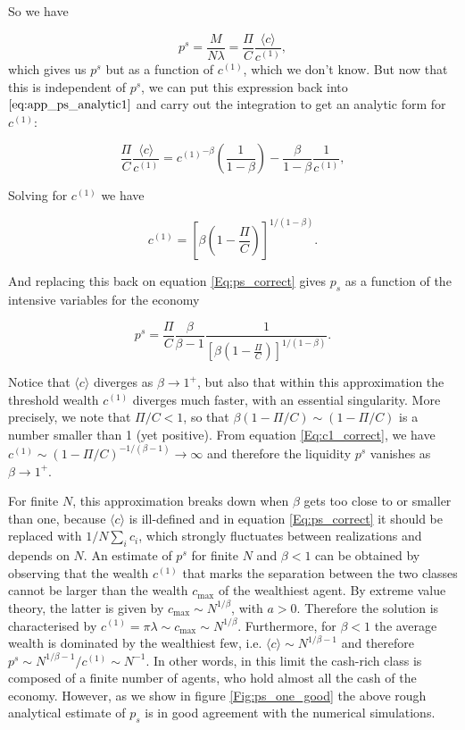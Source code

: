 So we have

\begin{equation}
 \label{Eq:ps_correct}
p^s = \frac{M}{N \lambda} = \frac{\Pi}{C} \frac{\langle c \rangle}{c^{(1)}},
\end{equation} 
which gives us $p^s$ but as a function of $c^{(1)}$, which we don't know. But now that this is independent of $p^s$, we can put this expression back into $\eqref{eq:app_ps_analytic1}$ and carry out the integration to get an analytic form for $c^{(1)}$:

\begin{equation}
\frac{\Pi}{C} \frac{\langle c \rangle}{c^{(1)}} = {c^{(1)}}^{-\beta} \left( \frac{1}{1-\beta} \right) - \frac{\beta}{1 - \beta } \frac{1}{c^{(1)}},
\end{equation}

Solving for $c^{(1)}$ we have

\begin{equation}
\label{Eq:c1_correct}
c^{(1)} = \left[\beta \left(  1 - \frac{\Pi}{C}\right) \right]^{1/(1 - \beta)}.
\end{equation}

And replacing this back on equation \eqref{Eq:ps_correct} gives $p_s$ as a function of the intensive variables for the economy

\begin{equation}
p^s = \frac{\Pi}{C}\frac{\beta}{\beta - 1} \frac{1}{\left[\beta \left(1 - \frac{\Pi}{C}\right) \right]^{1/(1 - \beta)}}.
\end{equation}

Notice that $\langle c \rangle$ diverges as $\beta \to 1^+$, but also that within this approximation the threshold wealth $c^{(1)}$ diverges much faster, with an essential singularity. More precisely, we note that $\Pi/C<1$, so that $\beta ( 1- \Pi/C) \sim (1-\Pi/C)$ is a number smaller than 1 (yet positive). From equation \eqref{Eq:c1_correct}, we have $c^{(1)}\sim (1-\Pi/C)^{-1/(\beta-1)} \to \infty$ and therefore the liquidity $p^s$ vanishes as $\beta \to 1^+$. 

For finite $N$, this approximation breaks down when $\beta$ gets too close to or smaller than one, because $\langle c \rangle$ is ill-defined and in equation \eqref{Eq:ps_correct} it should be replaced with $1/N \sum_i c_i $, which strongly fluctuates between realizations and depends on $N$. An estimate of $p^s$ for finite $N$ and $\beta<1$ can be obtained by observing that the wealth $c^{(1)}$ that marks the separation between the two classes cannot be larger than the wealth $c_{\max}$ of the wealthiest agent. By extreme value theory, the latter is given by $c_{\max}\sim N^{1/\beta}$, with $a>0$. Therefore the solution is characterised by $ c^{(1)}=\pi \lambda\sim c_{\max}\sim N^{1/\beta}$. Furthermore, for $\beta<1$ the average wealth is dominated by the wealthiest few, i.e. $\langle c \rangle \sim N^{1/\beta-1}$ and therefore  $p^s \sim N^{1/\beta-1}/c^{(1)} \sim N^{-1}$. In other words, in this limit the cash-rich class is composed of a finite number of agents, who hold almost all the cash of the economy. However, as we show in figure \ref{Fig:ps_one_good} the above rough analytical estimate of $p_s$ is in good agreement with the numerical simulations.

